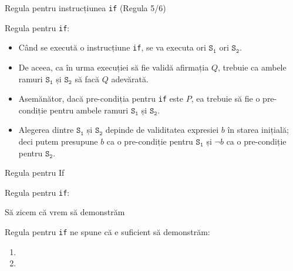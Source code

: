 \begin{frame}{Regula pentru instrucțiunea {\tt if} (Regula 5/6)}

\alert{Regula pentru {\tt if}:}
\begin{center}
\end{center}

\pause
\begin{itemize}
	\item Când se execută o instrucțiune {\tt if}, se va executa ori $\mathtt{S_1}$ ori $\mathtt{S_2}$.
	\item De aceea, ca în urma execuției să fie validă afirmația $Q$, trebuie ca \alert{ambele} ramuri $\mathtt{S_1}$ și $\mathtt{S_2}$ să facă $Q$ adevărată.
	\item Asemănător, dacă pre-condiția pentru {\tt if} este $P$, ea trebuie să fie \alert{o} pre-condiție pentru \alert{ambele} ramuri $\mathtt{S_1}$  și $\mathtt{S_2}$.
	\item Alegerea dintre $\mathtt{S_1}$ și $\mathtt{S_2}$ depinde de validitatea expresiei $b$ în starea inițială; deci putem presupune $b$ ca \alert{o} pre-condiție pentru $\mathtt{S_1}$ și $\neg b$ ca \alert{o} pre-condiție pentru $\mathtt{S_2}$.
\end{itemize}
\end{frame}

\begin{frame}{Regula pentru If}

\alert{Regula pentru {\tt if}:}
\begin{center}
\end{center}

\begin{example}

Să zicem că vrem să demonstrăm

\begin{center}
\end{center}
\pause
Regula pentru {\tt if} ne spune că e suficient să demonstrăm:
\begin{enumerate}[I]
	\item {}
	\item {}
\end{enumerate}
\end{example}
\end{frame}


